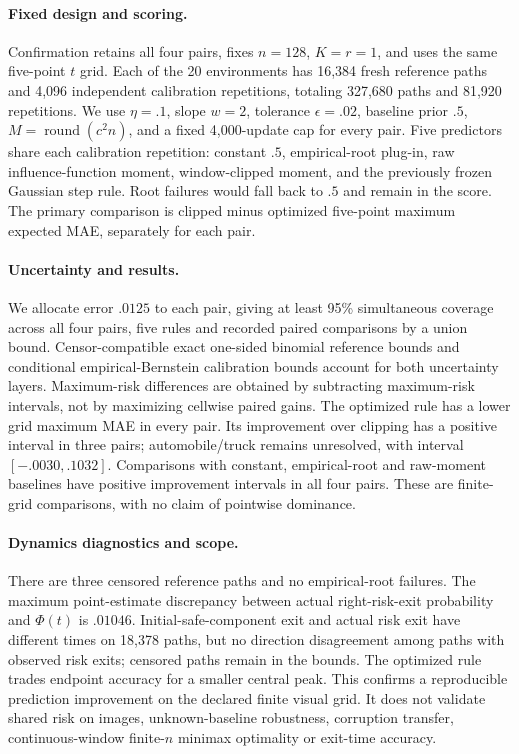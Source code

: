 \paragraph{Fixed design and scoring.} Confirmation retains all four pairs, fixes $n=128$, $K=r=1$, and uses the same five-point $t$ grid. Each of the 20 environments has 16,384 fresh reference paths and 4,096 independent calibration repetitions, totaling 327,680 paths and 81,920 repetitions. We use $\eta=.1$, slope $w=2$, tolerance $\epsilon=.02$, baseline prior $.5$, $M=\operatorname{round}(c^2n)$, and a fixed 4,000-update cap for every pair. Five predictors share each calibration repetition: constant $.5$, empirical-root plug-in, raw influence-function moment, window-clipped moment, and the previously frozen Gaussian step rule. Root failures would fall back to $.5$ and remain in the score. The primary comparison is clipped minus optimized five-point maximum expected MAE, separately for each pair.

\paragraph{Uncertainty and results.} We allocate error $.0125$ to each pair, giving at least 95\% simultaneous coverage across all four pairs, five rules and recorded paired comparisons by a union bound. Censor-compatible exact one-sided binomial reference bounds and conditional empirical-Bernstein calibration bounds account for both uncertainty layers. Maximum-risk differences are obtained by subtracting maximum-risk intervals, not by maximizing cellwise paired gains. The optimized rule has a lower grid maximum MAE in every pair. Its improvement over clipping has a positive interval in three pairs; automobile/truck remains unresolved, with interval $[-.0030,.1032]$. Comparisons with constant, empirical-root and raw-moment baselines have positive improvement intervals in all four pairs. These are finite-grid comparisons, with no claim of pointwise dominance.

\paragraph{Dynamics diagnostics and scope.} There are three censored reference paths and no empirical-root failures. The maximum point-estimate discrepancy between actual right-risk-exit probability and $\Phi(t)$ is $.01046$. Initial-safe-component exit and actual risk exit have different times on 18,378 paths, but no direction disagreement among paths with observed risk exits; censored paths remain in the bounds. The optimized rule trades endpoint accuracy for a smaller central peak. This confirms a reproducible prediction improvement on the declared finite visual grid. It does not validate shared risk on images, unknown-baseline robustness, corruption transfer, continuous-window finite-$n$ minimax optimality or exit-time accuracy.

